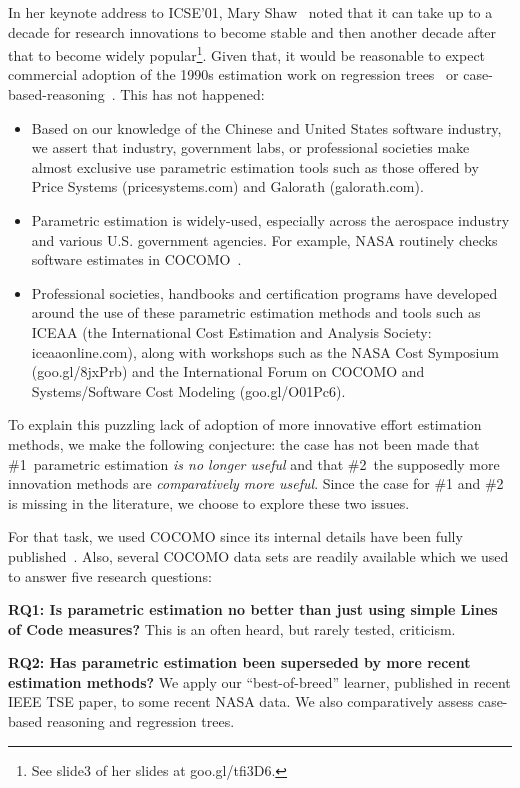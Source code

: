 \documentclass{sig-alternate}
\newcommand{\bi}{\begin{itemize}}
\newcommand{\ei}{\end{itemize}}
\begin{document}
In her keynote address to ICSE'01, Mary Shaw~\cite{shaw01} noted that it can take up to a
decade  for  research innovations
to become stable and then another decade after that to become
widely popular\footnote{See slide3 of her slides at goo.gl/tfi3D6.}. Given that, it would be reasonable
to expect commercial adoption of  the 1990s estimation work
on  regression trees~\cite{shepperd97} or case-based-reasoning~\cite{shepperd97}.
This has not happened:
\bi
\item
Based on our knowledge of the Chinese and United States software industry,
we assert that  industry, government labs, or professional societies
make almost exclusive
use  parametric estimation tools such as those offered by 
Price Systems (pricesystems.com) and  Galorath (galorath.com).
\item
Parametric estimation is
widely-used, especially across the aerospace
industry and various U.S. government agencies. For example,
NASA routinely checks  software estimates 
in  COCOMO~\cite{dabney07}.  
\item
Professional societies, handbooks and
certification programs have developed around the use
of these parametric estimation methods and tools such as ICEAA
(the
International Cost Estimation and Analysis Society: 
iceaaonline.com), along with workshops such as the
NASA Cost Symposium (goo.gl/8jxPrb) and the
International Forum on COCOMO and Systems/Software
Cost Modeling (goo.gl/O01Pc6).
\ei
To explain this puzzling lack of adoption of more innovative
effort estimation methods, we make the following conjecture:
the case has not been made that \#1~parametric estimation {\em is no longer useful} 
and that 
\#2~the supposedly more
innovation methods are {\em comparatively  more useful}.
Since the case for \#1 and \#2 is missing in the literature,
we choose to  explore these two issues.

For that task,
we used COCOMO since its
internal details have been fully
published~\cite{boehm00b}. Also, several COCOMO data
sets are readily available
which we used to   answer five research questions:

{\bf RQ1: Is parametric estimation no better than
  just using simple Lines of Code measures?}  
This is an often heard, but rarely tested,
criticism.

{\bf RQ2: Has parametric estimation been superseded
 by more recent estimation methods?}  We 
 apply our ``best-of-breed''
learner, published in recent IEEE TSE paper, to some
recent NASA data. We also comparatively assess
case-based reasoning and regression trees.
\end{document}
